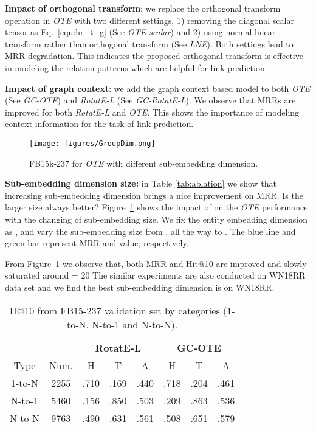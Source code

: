 \documentclass[11pt,a4paper]{article}
\begin{document}
\noindent\textbf{Impact of orthogonal transform}: we replace the orthogonal transform operation in {\it OTE} with two different settings, 1) removing the diagonal scalar tensor as Eq.~\ref{equ:hr_t_g} (See \textit{OTE-scalar}) and 2) using normal linear transform rather than orthogonal transform (See \textit{LNE}). Both settings lead to MRR degradation. This indicates the proposed orthogonal transform is effective in modeling the relation patterns which are helpful for link prediction.
    
\noindent\textbf{Impact of graph context}: we add the graph context based model to both  {\it OTE} (See \textit{GC-OTE}) and {\it RotatE-L} (See \textit{GC-RotatE-L}). We observe that MRRs are improved for both {\it RotatE-L} and {\it OTE}. This shows the importance of modeling context information for the task of link prediction.








\begin{figure}[t!]
    \texttt{[image: figures/GroupDim.png]}
    \caption{FB15k-237 for {\it OTE} with different sub-embedding dimension.}
    \label{fig:groupdim}
\end{figure}

\noindent\textbf{Sub-embedding dimension size:} in Table \ref{tab:ablation} we show that increasing sub-embedding dimension brings a nice improvement on MRR. Is the larger size always better?
Figure~\ref{fig:groupdim} shows the impact of
 on the {\it OTE} performance with the changing of sub-embedding size. We fix the entity embedding dimension as , and vary the sub-embedding size from , all the way to . The blue line and green bar represent MRR and  value, respectively. 

From Figure~\ref{fig:groupdim} we observe that, both MRR and Hit@10 are improved and slowly saturated around  = 20
The similar experiments are also conducted on WN18RR data set and we find the best sub-embedding dimension is  on WN18RR.

\begin{table}[!h]
    \centering\scriptsize
    \begin{tabular}{c|c|c|c|c|c|c|c}
        \hline
         & &\multicolumn{3}{c|}{\textbf{RotatE-L}} & \multicolumn{3}{c}{\textbf{GC-OTE}} \\
        \cline{3-8}
       Type  & Num. & H &T & A & H &T & A \\
       \hline
       1-to-N & 2255 &.710 & .169 & .440 & .718 &.204 & .461 \\
       \hline
       N-to-1 & 5460 &.156 & .850 & .503 & .209 & .863 & .536 \\
       \hline
       N-to-N & 9763 &.490 & .631 & .561 & .508 & .651 & .579\\
       \hline
    \end{tabular}
    \caption{H@10 from FB15-237 validation set by categories (1-to-N, N-to-1 and N-to-N).}
    \label{tab:categories}
\end{table}
\end{document}
